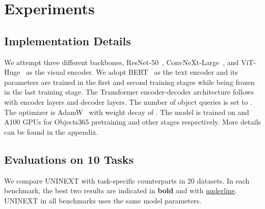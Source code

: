 \documentclass[10pt,twocolumn,letterpaper]{article}
\newcommand{\rankfirst}[1]{\textbf{#1}}
\newcommand{\ranksecond}[1]{\underline{#1}}
\begin{document}
\section{Experiments}
\subsection{Implementation Details}
We attempt three different backbones, ResNet-50~\cite{ResNet}, ConvNeXt-Large~\cite{ConvNeXt}, and ViT-Huge~\cite{ViT} as the visual encoder. We adopt BERT~\cite{BERT} as the text encoder and its parameters are trained in the first and second training stages while being frozen in the last training stage. The Transformer encoder-decoder architecture follows ~\cite{DeformableDETR} with  encoder layers and  decoder layers. The number of object queries  is set to . The optimizer is AdamW~\cite{AdamW} with weight decay of . The model is trained on  and  A100 GPUs for Objects365 pretraining and other stages respectively. More details can be found in the appendix.










\subsection{Evaluations on 10 Tasks}

We compare UNINEXT with task-specific counterparts in 20 datasets. In each benchmark, the best two results are indicated in \rankfirst{bold} and with \ranksecond{underline}. UNINEXT in all benchmarks uses the same model parameters.
\end{document}
